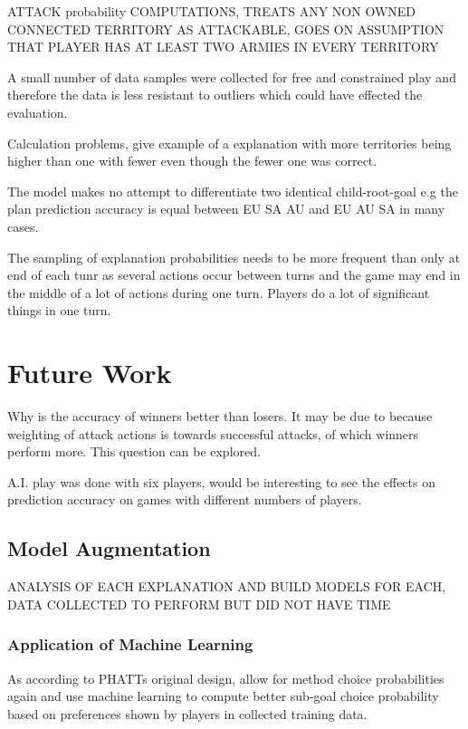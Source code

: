 \documentclass[parskip]{cs4rep}
\begin{document}
ATTACK probability COMPUTATIONS, TREATS ANY NON OWNED CONNECTED TERRITORY AS ATTACKABLE, GOES ON ASSUMPTION THAT PLAYER HAS AT LEAST TWO ARMIES IN EVERY TERRITORY

A small number of data samples were collected for free and constrained play and therefore the data is less resistant to outliers which could have effected the evaluation.

Calculation problems, give example of a explanation with more territories being higher than one with fewer even though the fewer one was correct.

The model makes no attempt to differentiate two identical child-root-goal  e.g the plan prediction accuracy is equal between EU SA AU and EU AU SA in many cases. 

The sampling of explanation probabilities needs to be more frequent than only at end of each tunr as several actions occur between turns and the game may end in the middle of a lot of actions during one turn. Players do a lot of significant things in one turn.

\section{Future Work}

Why is the accuracy of winners better than losers. It may be due to because weighting of attack actions is towards successful attacks, of which winners perform more. This question can be explored.

A.I. play was done with six players, would be interesting to see the effects on prediction accuracy on games with different numbers of players.

\subsection{Model Augmentation}

ANALYSIS OF EACH EXPLANATION AND BUILD MODELS FOR EACH, DATA COLLECTED TO PERFORM BUT DID NOT HAVE TIME

\subsubsection{Application of Machine Learning}

As according to PHATTs original design, allow for method choice probabilities again and use machine learning to compute better sub-goal choice probability based on preferences shown by players in collected training data.
\end{document}
